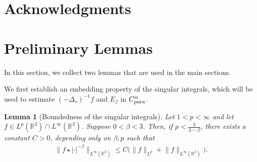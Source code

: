 \documentclass[reqno,11pt,final]{amsart}
\theoremstyle{plain}
\newtheorem{lemma}[theorem]{Lemma}
\numberwithin{equation}{section}
\numberwithin{theorem}{section}
\begin{document}
\section*{Acknowledgments}

\appendix
\section{Preliminary Lemmas}

In this section, we collect two lemmas that are used in the main sections.

We first establish an embedding property of the singular integrals, which will be used to estimate $(-\Delta_v)^{-1}f$ and $E_f$ in $C^\alpha_\textup{para}$.

\begin{lemma}[Boundedness of the singular integrals]\label{Linfty.est.sing.int}Let $1< p<\infty$ and let $f\in L^p(\mathbb{R}^3)\cap L^\infty(\mathbb{R}^3)$. Suppose $0< \beta <3$. Then, if $p<\frac{3}{3-\beta}$, there exists a constant $C>0$, depending only on $\beta,p$ such that
\begin{align}\label{3.1 result}
\lVert f\star |\cdot|^{-\beta}\rVert_{L^\infty(\mathbb{R}^3)}\le C  \big(\|f\|_{L^p} + \lVert f\rVert_{L^\infty(\mathbb{R}^3)}\big).
\end{align}
\end{lemma}
\end{document}
